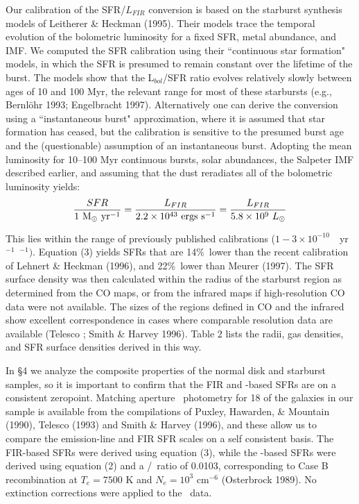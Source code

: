 Our calibration of the SFR/$L_{FIR}$ conversion is based on the starburst
synthesis models of Leitherer \& Heckman (1995).  Their models trace 
the temporal evolution of the bolometric luminosity for a fixed SFR,
metal abundance, and IMF.  We computed the SFR calibration using their
``continuous star formation" models, in which the SFR is presumed to
remain constant over the lifetime of the burst.  The models show that the
L$_{bol}$/SFR ratio evolves relatively slowly between ages of 10 and 100 Myr,
the relevant range for most of these starbursts  
(e.g., Bernl\"ohr 1993; Engelbracht 1997).  Alternatively one can derive
the conversion using a ``instantaneous burst" approximation, where it is 
assumed that star formation has ceased, but the calibration is sensitive
to the presumed burst age and the (questionable) assumption of an
instantaneous burst.  Adopting the mean luminosity for 10--100 Myr continuous
bursts, solar abundances, the Salpeter IMF described earlier,
and assuming that the dust reradiates all of the bolometric luminosity yields:
\begin{equation}
{ {SFR} \over {1~{\rm M_{\odot}~yr^{-1}}} } = { {L_{FIR}} \over {2.2 \times 10^{43}~ 
{\rm ergs~s^{-1}} } } =  
{ {L_{FIR}} \over {5.8 \times 
10^9~L_{\odot}} }
\end{equation}

\noindent
This lies within the range of previously published calibrations 
($1 - 3 \times 10^{-10}$~\msun~yr$^{-1}$~\lsun$^{-1})$.   
Equation (3) yields SFRs that are 14\%\ lower than the recent calibration of 
Lehnert \& Heckman (1996), and 22\%\ lower than Meurer \etal (1997).
The SFR surface density was then calculated within the radius of the 
starburst region as determined from the CO maps, or from the infrared
maps if high-resolution CO data were not available.  The sizes of the
regions defined in CO and the infrared show excellent correspondence
in cases where comparable resolution data are available
(Telesco ; Smith \& Harvey 1996).  Table 2 lists the 
radii, gas densities, and SFR surface densities derived in this way. 

In \S4 we analyze the composite properties of the normal disk and 
starburst samples, so it is important to confirm that the FIR and 
\halpha-based SFRs are on a consistent zeropoint.  Matching aperture \brgamma\ 
photometry for 18 of the galaxies in our sample is available from the 
compilations of Puxley, Hawarden, \& Mountain (1990), Telesco \etal (1993)  
and Smith \& Harvey (1996), and these allow us to compare the emission-line
and FIR SFR scales 
on a self consistent basis.  The FIR-based SFRs were derived using 
equation (3), while the \brgamma-based SFRs were derived using equation 
(2) and a \brgamma/\halpha\ ratio of 0.0103, corresponding to Case B
recombination at $T_e = 7500$ K and $N_e = 10^3$ cm$^{-6}$ (Osterbrock 1989).  
No extinction corrections were applied to the \brgamma\ data.   

